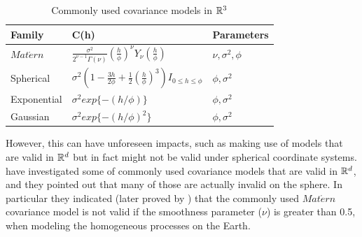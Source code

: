 \begin{table}[H]
\label{parameters}
\centering
\caption[Commonly Used Covariance Models in $\R^3$]{Commonly used covariance models in $\R^3$}
\vskip 16pt
\begin{tabular}{|l|l|l|}
\hline
Family & C(h)  & Parameters \\ \hline \hline
$Mat\acute{e}rn$ &  $\frac{\sigma^2}{2^{\nu-1}\Gamma(\nu)} (\frac{h}{\phi})^{\nu} Y_{\nu}(\frac{h}{\phi})$  & $\nu, \sigma^2, \phi$  \\

Spherical & $\sigma^2(1-\frac{3h}{2\phi}+\frac{1}{2}(\frac{h}{\phi})^3)I_{0\le h\le \phi}$ & $\phi, \sigma^2$ \\

Exponential & $\sigma^2exp\{-(h/\phi)\}$ & $\phi, \sigma^2$  \\

Gaussian & $\sigma^2exp \{-(h/\phi)^2\}$ & $\phi, \sigma^2$  \\ \hline
\end{tabular}
\end{table}
However, this can have unforeseen impacts, such as making use of models that are valid in $\mathbb{R}^d$ but in fact might not be valid under spherical coordinate systems. \cite{HuangZhangRobeson2011} have investigated some of commonly used covariance models that are valid in $\mathbb{R}^d$, and they pointed out that many of those are actually invalid on the sphere. In particular they indicated (later proved by \cite{Gneiting2013}) that the commonly used $Mat\acute{e}rn$ covariance model is not valid if the smoothness parameter ($\nu$) is greater than 0.5, when modeling the homogeneous processes on the Earth.



